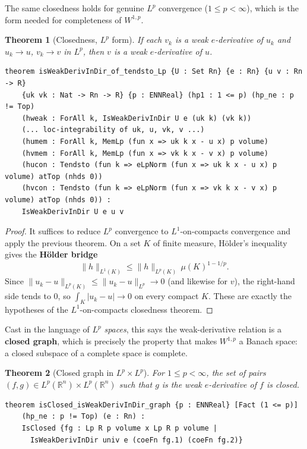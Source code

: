 ﻿\documentclass[12pt, a4paper]{article}
\renewcommand{\_}{\origunderscore\allowbreak}
\theoremstyle{definition}
\theoremstyle{plain}
\newtheorem{theorem}{Theorem}[section]
\begin{document}
The same closedness holds for genuine $L^p$ convergence ($1\le p<\infty$), which is the
form needed for completeness of $W^{1,p}$.

\begin{theorem}[Closedness, $L^p$ form]
If each $v_k$ is a weak $e$-derivative of $u_k$ and $u_k\to u$, $v_k\to v$ in $L^p$,
then $v$ is a weak $e$-derivative of $u$.
\end{theorem}

\begin{lstlisting}[caption={Closedness under Lp limits (proved)}]
theorem isWeakDerivInDir_of_tendsto_Lp {U : Set Rn} {e : Rn} {u v : Rn -> R}
    {uk vk : Nat -> Rn -> R} {p : ENNReal} (hp1 : 1 <= p) (hp_ne : p != Top)
    (hweak : ForAll k, IsWeakDerivInDir U e (uk k) (vk k))
    (... loc-integrability of uk, u, vk, v ...)
    (humem : ForAll k, MemLp (fun x => uk k x - u x) p volume)
    (hvmem : ForAll k, MemLp (fun x => vk k x - v x) p volume)
    (hucon : Tendsto (fun k => eLpNorm (fun x => uk k x - u x) p volume) atTop (nhds 0))
    (hvcon : Tendsto (fun k => eLpNorm (fun x => vk k x - v x) p volume) atTop (nhds 0)) :
    IsWeakDerivInDir U e u v
\end{lstlisting}

\begin{proof}
It suffices to reduce $L^p$ convergence to $L^1$-on-compacts convergence and apply the
previous theorem. On a set $K$ of finite measure, Hölder's inequality gives the
\textbf{Hölder bridge}
\[
  \|h\|_{L^1(K)} \le \|h\|_{L^p(K)}\,\mu(K)^{1-1/p}.
\]
Since $\|u_k-u\|_{L^p(K)}\le\|u_k-u\|_{L^p}\to0$ (and likewise for $v$), the right-hand side
tends to $0$, so $\int_K|u_k-u|\to0$ on every compact $K$. These are exactly the hypotheses
of the $L^1$-on-compacts closedness theorem.
\end{proof}

Cast in the language of $L^p$ \emph{spaces}, this says the weak-derivative relation is a
\textbf{closed graph}, which is precisely the property that makes $W^{1,p}$ a Banach space:
a closed subspace of a complete space is complete.

\begin{theorem}[Closed graph in $L^p\times L^p$]
For $1\le p<\infty$, the set of pairs $(f,g)\in L^p(\mathbb{R}^n)\times L^p(\mathbb{R}^n)$
such that $g$ is the weak $e$-derivative of $f$ is closed.
\end{theorem}

\begin{lstlisting}[caption={Weak-derivative graph is closed in Lp x Lp (proved)}]
theorem isClosed_isWeakDerivInDir_graph {p : ENNReal} [Fact (1 <= p)]
    (hp_ne : p != Top) (e : Rn) :
    IsClosed {fg : Lp R p volume x Lp R p volume |
      IsWeakDerivInDir univ e (coeFn fg.1) (coeFn fg.2)}
\end{lstlisting}
\end{document}
